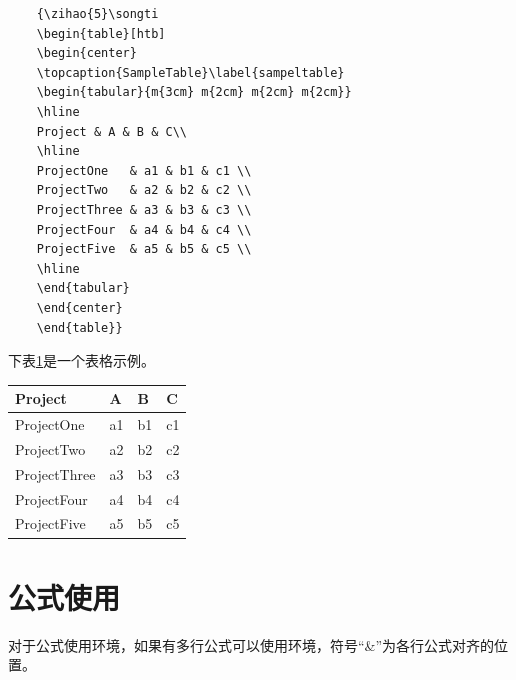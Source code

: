 \begin{spacing}{1.5}
	\begin{lstlisting}
	{\zihao{5}\songti
	\begin{table}[htb]
	\begin{center}
	\topcaption{SampleTable}\label{sampeltable}
	\begin{tabular}{m{3cm} m{2cm} m{2cm} m{2cm}}
	\hline
	Project & A & B & C\\
	\hline
	ProjectOne   & a1 & b1 & c1 \\
	ProjectTwo   & a2 & b2 & c2 \\
	ProjectThree & a3 & b3 & c3 \\
	ProjectFour  & a4 & b4 & c4 \\
	ProjectFive  & a5 & b5 & c5 \\
	\hline
	\end{tabular}
	\end{center}
	\end{table}}
	\end{lstlisting}
	
	下表\ref{sampeltable}是一个表格示例。
	
	{\wuhao\songti
		\begin{table}[htb]
			\begin{center}
				\label{sampeltable}
				\begin{tabular}{m{3cm} m{2cm} m{2cm} m{2cm}}
					\hline
					Project & A & B & C\\
					\hline
					ProjectOne& a1 & b1 & c1 \\
					ProjectTwo & a2 & b2 & c2 \\
					ProjectThree & a3 & b3 & c3 \\
					ProjectFour& a4 & b4 & c4 \\
					ProjectFive & a5& b5 & c5 \\
					\hline
				\end{tabular}
			\end{center}
	\end{table}}
	
	\section{公式使用}
	对于公式使用环境，如果有多行公式可以使用环境，符号“\&”为各行公式对齐的位置。
	

\end{spacing}
